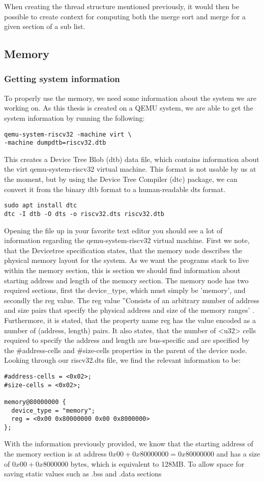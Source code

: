 When creating the thread structure mentioned previously, it
would then be possible to create context for computing both the merge sort and
merge for a given section of a sub list.



\subsection{Memory}
\subsubsection*{Getting system information}\label{sec:sys-info}
To properly use the memory, we need some information about the system we are
working on. As this thesis is created on a QEMU system, we are able to get the
system information by running the following:
\begin{lstlisting}
qemu-system-riscv32 -machine virt \
-machine dumpdtb=riscv32.dtb
\end{lstlisting}
 This creates a Device Tree Blob (dtb) data file, which contains information
 about the virt qemu-system-riscv32 virtual machine. This format is not usable
 by us at the moment, but by using the Device Tree Compiler (dtc) package, we
 can convert it from the binary dtb format to a human-readable dts format.
\begin{lstlisting}
sudo apt install dtc
dtc -I dtb -O dts -o riscv32.dts riscv32.dtb
\end{lstlisting}
Opening the file up in your favorite text editor you should see a lot of
information regarding the qemu-system-riscv32 virtual machine. First we note,
that the Devicetree specification states, that the memory node describes the
physical memory layout for the system. As we want the programs stack to live
within the memory section, this is section we should find information about
starting address and length of the memory section. The memory node has two
required sections, first the device\_type, which must simply be 'memory', and
secondly the reg value. The reg value ''Consists of an arbitrary number of
address and size pairs that specify the physical address and size of the memory
ranges' \cite{DTS}. Furthermore, it is stated, that the property name reg has
the value encoded as a number of (address, length) pairs. It also states, that
the number of <u32> cells required to specify the address and length are
bus-specific and are specified by the \#address-cells and \#size-cells
properties in the parent of the device node. Looking through our riscv32.dts
file, we find the relevant information to be:
\begin{lstlisting}
#address-cells = <0x02>;
#size-cells = <0x02>;

memory@80000000 {
  device_type = "memory";
  reg = <0x00 0x80000000 0x00 0x8000000>
};
\end{lstlisting}
With the information previously provided, we know that the starting address of
the memory section is at address $0x00 + 0x80000000 = 0x80000000$ and has a size
of $0x00 + 0x8000000$ bytes, which is equivalent to 128MB. To allow space for
saving static values such as .bss and .data sections

